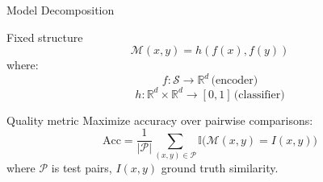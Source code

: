 \documentclass{beamer}
\begin{document}
\begin{frame}{Model Decomposition}
\begin{block}{Fixed structure}
    $$ \mathcal{M}(x, y) = h(f(x), f(y)) $$
    where:
    $$ f : \mathcal{S} \rightarrow \mathbb{R}^d \, \text{(encoder)} $$
    $$ h : \mathbb{R}^d \times \mathbb{R}^d \rightarrow [0, 1] \, \text{(classifier)} $$
\end{block}

\begin{block}{Quality metric}
    Maximize accuracy over pairwise comparisons:
    \begin{equation*}
    \text{Acc} = \frac{1}{|\mathcal{P}|} \sum_{(x,y) \in \mathcal{P}} \mathbb{I}\big(\mathcal{M}(x,y) = I(x,y)\big)
    \end{equation*}
    where $\mathcal{P}$ is test pairs, $I(x,y)$ ground truth similarity.
\end{block}
\end{frame}

\end{document}
